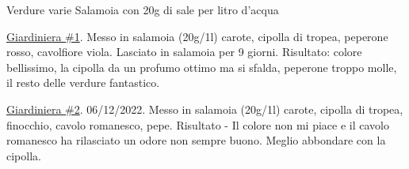 \begin{ingreds}
	Verdure varie
	Salamoia con 20g di sale per litro d'acqua



\end{ingreds}

\begin{method}
\underline{Giardiniera \#1}. Messo in salamoia (20g/1l) carote, cipolla di tropea, peperone rosso, cavolfiore viola. Lasciato in salamoia per 9 giorni. Risultato: colore bellissimo, la cipolla da un profumo ottimo ma si sfalda, peperone troppo molle, il resto delle verdure fantastico.

\underline{Giardiniera \#2}. 06/12/2022. Messo in salamoia (20g/1l) carote, cipolla di tropea, finocchio, cavolo romanesco, pepe. Risultato - Il colore non mi piace e il cavolo romanesco ha rilasciato un odore non sempre buono. Meglio abbondare con la cipolla.



\end{method}




